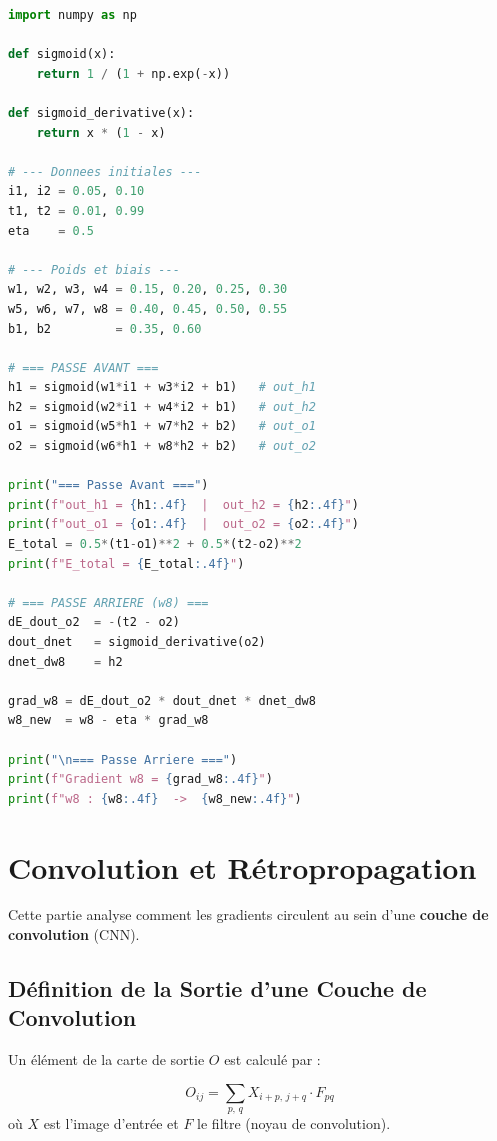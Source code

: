 \documentclass[12pt, a4paper]{article}
\begin{document}
\begin{lstlisting}[language=Python, caption={Simulation du Backpropagation -- MLP 2-2-2}, label=lst:backprop]
import numpy as np

def sigmoid(x):
    return 1 / (1 + np.exp(-x))

def sigmoid_derivative(x):
    return x * (1 - x)

# --- Donnees initiales ---
i1, i2 = 0.05, 0.10
t1, t2 = 0.01, 0.99
eta    = 0.5

# --- Poids et biais ---
w1, w2, w3, w4 = 0.15, 0.20, 0.25, 0.30
w5, w6, w7, w8 = 0.40, 0.45, 0.50, 0.55
b1, b2         = 0.35, 0.60

# === PASSE AVANT ===
h1 = sigmoid(w1*i1 + w3*i2 + b1)   # out_h1
h2 = sigmoid(w2*i1 + w4*i2 + b1)   # out_h2
o1 = sigmoid(w5*h1 + w7*h2 + b2)   # out_o1
o2 = sigmoid(w6*h1 + w8*h2 + b2)   # out_o2

print("=== Passe Avant ===")
print(f"out_h1 = {h1:.4f}  |  out_h2 = {h2:.4f}")
print(f"out_o1 = {o1:.4f}  |  out_o2 = {o2:.4f}")
E_total = 0.5*(t1-o1)**2 + 0.5*(t2-o2)**2
print(f"E_total = {E_total:.4f}")

# === PASSE ARRIERE (w8) ===
dE_dout_o2  = -(t2 - o2)
dout_dnet   = sigmoid_derivative(o2)
dnet_dw8    = h2

grad_w8 = dE_dout_o2 * dout_dnet * dnet_dw8
w8_new  = w8 - eta * grad_w8

print("\n=== Passe Arriere ===")
print(f"Gradient w8 = {grad_w8:.4f}")
print(f"w8 : {w8:.4f}  ->  {w8_new:.4f}")
\end{lstlisting}

\section{Convolution et Rétropropagation}

Cette partie analyse comment les gradients circulent au sein d'une
\textbf{couche de convolution} (CNN).

\subsection{Définition de la Sortie d'une Couche de Convolution}

Un élément de la carte de sortie $O$ est calculé par :

\begin{mathbox}
\begin{equation}
    O_{ij} = \sum_{p,\,q} X_{i+p,\,j+q} \cdot F_{pq}
    \label{eq:conv}
\end{equation}
où $X$ est l'image d'entrée et $F$ le filtre (noyau de convolution).
\end{mathbox}
\end{document}
